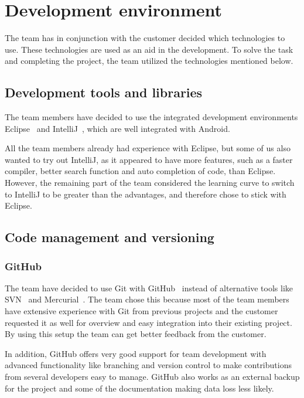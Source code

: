 \chapter{Development environment}

The team has in conjunction with the customer decided which technologies to use. These technologies are used as an aid in the development. To solve the task and completing the project, the team utilized the technologies mentioned below.

\section{Development tools and libraries}

The team members have decided to use the integrated development environments Eclipse~\cite{eclipse} and IntelliJ~\cite{intellij}, which are well integrated with Android. 

All the team members already had experience with Eclipse, but some of us also wanted to try out IntelliJ, as it appeared to have more features, such as a faster compiler, better search function and auto completion of code, than Eclipse. However, the remaining part of the team considered the learning curve to switch to IntelliJ to be greater than the advantages, and therefore chose to stick with Eclipse.

\section{Code management and versioning}
\subsection{GitHub}
The team have decided to use Git with GitHub~\cite{github} instead of alternative tools like SVN~\cite{svn} and Mercurial~\cite{mercurial}. 
The team chose this because most of the team members have extensive experience with Git from previous projects 
and the customer requested it as well for overview and easy integration into their existing project. By using 
this setup the team can get better feedback from the customer. 

In addition, GitHub offers very good support for team development 
with advanced functionality like branching and version control to make contributions from several developers easy 
to manage. GitHub also works as an external backup for the project and some of the documentation making data loss less likely.

